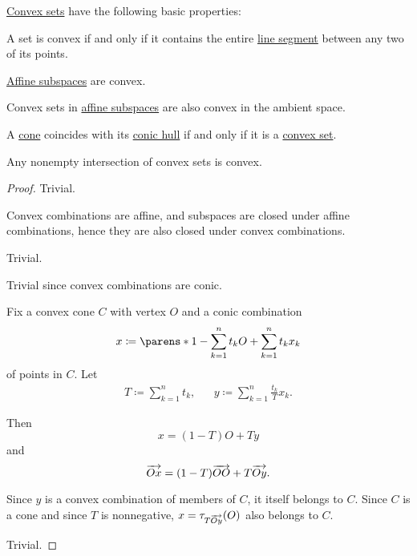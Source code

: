 \begin{proposition}\label{thm:def:convex_hull}
  \hyperref[def:convex_hull]{Convex sets} have the following basic properties:

  \begin{thmenum}
     A set is convex if and only if it contains the entire \hyperref[def:line_segment]{line segment} between any two of its points.

     \hyperref[def:affine_subspace]{Affine subspaces} are convex.

     Convex sets in \hyperref[def:affine_subspace]{affine subspaces} are also convex in the ambient space.

     A \hyperref[def:geometric_cone]{cone} coincides with its \hyperref[def:convex_hull]{conic hull} if and only if it is a \hyperref[def:convex_hull]{convex set}.

     Any nonempty intersection of convex sets is convex.
  \end{thmenum}
\end{proposition}
\begin{proof}
   Trivial.

   Convex combinations are affine, and subspaces are closed under affine combinations, hence they are also closed under convex combinations.

   Trivial.

  \SufficiencySubProof* Trivial since convex combinations are conic.

  \NecessitySubProof* Fix a convex cone \( C \) with vertex \( O \) and a conic combination
  \begin{equation*}
    x \coloneqq \parens*{ 1 - \sum_{k=1}^n t_k } O + \sum_{k=1}^n t_k x_k
  \end{equation*}
  of points in \( C \). Let
  \begin{align*}
    T \coloneqq \sum_{k=1}^n t_k,
    &&
    y \coloneqq \sum_{k=1}^n \frac {t_k} T x_k.
  \end{align*}

  Then
  \begin{equation*}
    x = (1 - T) O + T y
  \end{equation*}
  and
  \begin{equation*}
    \overrightarrow{Ox} = (1 - T) \overrightarrow{OO} + T \overrightarrow{Oy}.
  \end{equation*}

  Since \( y \) is a convex combination of members of \( C \), it itself belongs to \( C \). Since \( C \) is a cone and since \( T \) is nonnegative, \( x = \tau_{T \overrightarrow{Oy}}(O) \) also belongs to \( C \).

   Trivial.
\end{proof}

